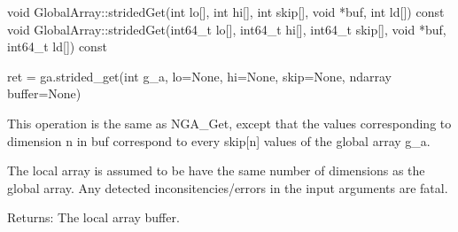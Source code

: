 \documentclass[12pt]{article}
\begin{document}
\begin{cxxapi}
\begin{cxxcode}
void GlobalArray::stridedGet(int lo[], int hi[], int skip[],
                             void *buf, int ld[]) const
void GlobalArray::stridedGet(int64_t lo[], int64_t hi[], int64_t skip[],
                             void *buf, int64_t ld[]) const
\end{cxxcode}
\begin{funcargs}
\end{funcargs}
\end{cxxapi}

\begin{pyapi}
\begin{pycode}
ret = ga.strided_get(int g_a, lo=None, hi=None, skip=None, ndarray buffer=None)
\end{pycode}
\begin{funcargs}
\end{funcargs}
\end{pyapi}

\ncoll

\begin{desc}

This operation is the same as NGA_Get, except that the values corresponding to
dimension n in buf correspond to every skip[n] values of the global array g_a.

The local array is assumed to be have the same number of dimensions as the
global array. Any detected inconsitencies/errors in the input arguments are
fatal.

Returns: The local array buffer.

\end{desc}

\end{document}
